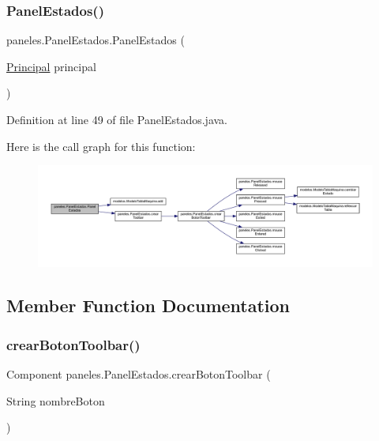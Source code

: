 \subsubsection{\texorpdfstring{Panel\+Estados()}{PanelEstados()}}
{\footnotesize\ttfamily paneles.\+Panel\+Estados.\+Panel\+Estados (\begin{DoxyParamCaption}\item[{\mbox{\hyperlink{classvistas_1_1_principal}{Principal}}}]{principal }\end{DoxyParamCaption})}



Definition at line 49 of file Panel\+Estados.\+java.

Here is the call graph for this function\+:\nopagebreak
\begin{figure}[H]
\begin{center}
\leavevmode
\includegraphics[width=350pt]{classpaneles_1_1_panel_estados_a58b73ebb992e4dd681a60d7d1d8497c2_cgraph}
\end{center}
\end{figure}


\subsection{Member Function Documentation}
\mbox{\label{classpaneles_1_1_panel_estados_af627b3edddac65046fd93dc774904597}} 
\subsubsection{\texorpdfstring{crear\+Boton\+Toolbar()}{crearBotonToolbar()}}
{\footnotesize\ttfamily Component paneles.\+Panel\+Estados.\+crear\+Boton\+Toolbar (\begin{DoxyParamCaption}\item[{String}]{nombre\+Boton }\end{DoxyParamCaption})}



